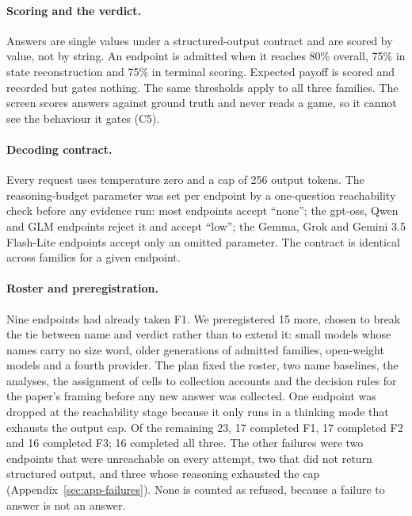 \documentclass[11pt]{article}
\begin{document}
\paragraph{Scoring and the verdict.}
Answers are single values under a structured-output contract and are scored by
value, not by string. An endpoint is admitted when it reaches 80\% overall,
75\% in state reconstruction and 75\% in terminal scoring. Expected payoff is
scored and recorded but gates nothing. The same thresholds apply to all three
families. The screen scores answers against ground truth and never reads a
game, so it cannot see the behaviour it gates (C5).

\paragraph{Decoding contract.}
Every request uses temperature zero and a cap of 256 output tokens. The
reasoning-budget parameter was set per endpoint by a one-question
reachability check before any evidence run: most endpoints accept ``none'';
the gpt-oss, Qwen and GLM endpoints reject it and accept ``low''; the Gemma,
Grok and Gemini 3.5 Flash-Lite endpoints accept only an omitted parameter. The contract is identical across families for a
given endpoint.

\paragraph{Roster and preregistration.}
Nine endpoints had already taken F1. We preregistered 15 more, chosen to break
the tie between name and verdict rather than to extend it: small models whose
names carry no size word, older generations of admitted families, open-weight
models and a fourth provider. The plan fixed the roster, two name baselines,
the analyses, the assignment of cells to collection accounts and the decision
rules for the paper's framing before any new answer was collected. One
endpoint was dropped at the reachability stage because it only runs in a
thinking mode that exhausts the output cap. Of the remaining 23, 17 completed
F1, 17 completed F2 and 16 completed F3; 16 completed all three. The other
failures were two endpoints that were unreachable on every attempt, two that
did not return structured output, and three whose reasoning exhausted the
cap (Appendix~\ref{sec:app-failures}). None is counted as refused, because a
failure to answer is not an answer.

\end{document}
